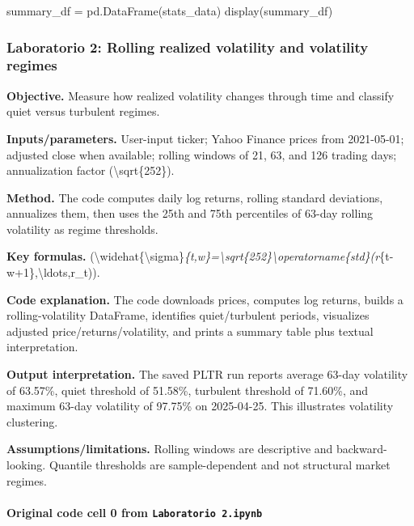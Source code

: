 \documentclass[
  11pt,
]{article}
\newenvironment{Shaded}{}{}
\newcommand{\NormalTok}[1]{#1}
\newcommand{\OperatorTok}[1]{\textcolor[rgb]{0.40,0.40,0.40}{#1}}
\begin{document}
\begin{Shaded}
\begin{Highlighting}[]
\NormalTok{summary\_df }\OperatorTok{=}\NormalTok{ pd.DataFrame(stats\_data)}
\NormalTok{display(summary\_df)}
\end{Highlighting}
\end{Shaded}

\subsubsection{Laboratorio 2: Rolling realized volatility and volatility regimes}\label{laboratorio-2-rolling-realized-volatility-and-volatility-regimes}

\textbf{Objective.} Measure how realized volatility changes through time and classify quiet versus turbulent regimes.

\textbf{Inputs/parameters.} User-input ticker; Yahoo Finance prices from 2021-05-01; adjusted close when available; rolling windows of 21, 63, and 126 trading days; annualization factor (\textbackslash sqrt\{252\}).

\textbf{Method.} The code computes daily log returns, rolling standard deviations, annualizes them, then uses the 25th and 75th percentiles of 63-day rolling volatility as regime thresholds.

\textbf{Key formulas.} (\textbackslash widehat\{\textbackslash sigma\}\emph{\{t,w\}=\textbackslash sqrt\{252\}\textbackslash operatorname\{std\}(r}\{t-w+1\},\textbackslash ldots,r\_t)).

\textbf{Code explanation.} The code downloads prices, computes log returns, builds a rolling-volatility DataFrame, identifies quiet/turbulent periods, visualizes adjusted price/returns/volatility, and prints a summary table plus textual interpretation.

\textbf{Output interpretation.} The saved PLTR run reports average 63-day volatility of 63.57\%, quiet threshold of 51.58\%, turbulent threshold of 71.60\%, and maximum 63-day volatility of 97.75\% on 2025-04-25. This illustrates volatility clustering.

\textbf{Assumptions/limitations.} Rolling windows are descriptive and backward-looking. Quantile thresholds are sample-dependent and not structural market regimes.

\paragraph{\texorpdfstring{Original code cell 0 from \texttt{Laboratorio\ 2.ipynb}}{Original code cell 0 from Laboratorio 2.ipynb}}\label{original-code-cell-0-from-laboratorio-2ipynb}
\end{document}
